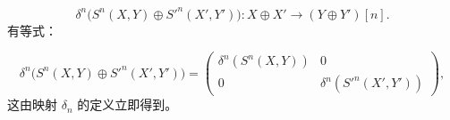 \[
\delta^n\bigl(S^n(X,Y)\oplus {S'}^n(X',Y')\bigr)
\colon X\oplus X'\longrightarrow (Y\oplus Y')[n].
\]
有等式：

\begin{equation}
\delta^n\bigl(S^n(X,Y)\oplus {S'}^n(X',Y')\bigr)
=
\begin{pmatrix}
\delta^n(S^n(X,Y))&0\\
0&\delta^n({S'}^n(X',Y'))
\end{pmatrix},
\tag{3.2.10.1}
\end{equation}
这由映射 $\delta_n$ 的定义立即得到。
\endgroup
